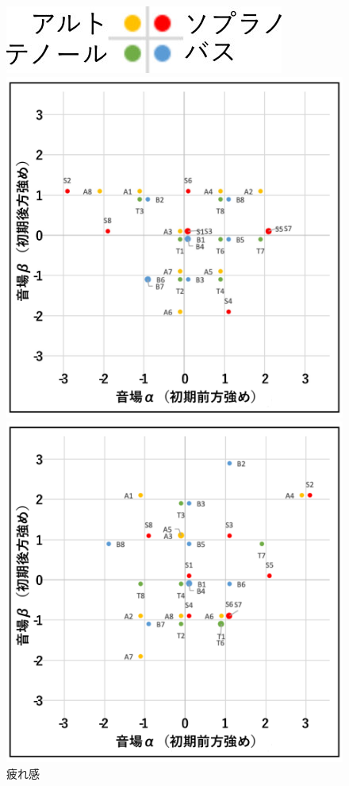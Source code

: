 \documentclass[11pt,a4j]{jreport}
\begin{document}
\begin{figure}[H]
  \begin{minipage}{1\linewidth}
    \centering
    \includegraphics[scale=.7]{images/subjectiveExp/scat_0_legend.jpg}
  \end{minipage}

  \begin{minipage}{0.5\linewidth}
    \centering
    \includegraphics[width=.9\linewidth]{images/subjectiveExp/scat_early_08tiredness.pdf}
    \caption*{疲れ感}
  \end{minipage}%
  \begin{minipage}{0.5\linewidth}
    \centering
    \includegraphics[width=.9\linewidth]{images/subjectiveExp/scat_early_09dynamics.pdf}

\end{minipage}
\end{figure}
\end{document}
